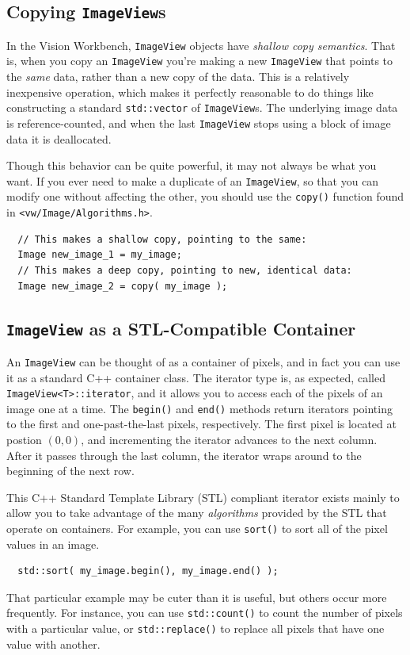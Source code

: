 \subsection{Copying {\tt ImageView}s}

In the Vision Workbench, \verb#ImageView# objects have {\it shallow 
copy semantics}.  That is, when you copy an \verb#ImageView# you're 
making a new \verb#ImageView# that points to the {\it same} data, 
rather than a new copy of the data.  This is a relatively inexpensive 
operation, which makes it perfectly reasonable to do things like 
constructing a standard \verb#std::vector# of \verb#ImageView#s.  The 
underlying image data is reference-counted, and when the last 
\verb#ImageView# stops using a block of image data it is deallocated. 

Though this behavior can be quite powerful, it may not always be 
what you want.  If you ever need to make a duplicate of an 
\verb#ImageView#, so that you can modify one without affecting the 
other, you should use the \verb#copy()# function found in 
\verb#<vw/Image/Algorithms.h>#.
\begin{verbatim}
  // This makes a shallow copy, pointing to the same:
  Image new_image_1 = my_image;
  // This makes a deep copy, pointing to new, identical data:
  Image new_image_2 = copy( my_image );
\end{verbatim}

\subsection{{\tt ImageView} as a STL-Compatible Container}

An \verb#ImageView# can be thought of as a container of pixels, and in
fact you can use it as a standard C++ container class.  The iterator
type is, as expected, called \verb#ImageView<T>::iterator#, and it
allows you to access each of the pixels of an image one at a time.
The \verb#begin()# and \verb#end()# methods return iterators pointing
to the first and one-past-the-last pixels, respectively.  The first
pixel is located at postion $(0,0)$, and incrementing the iterator
advances to the next column.  After it passes through the last column,
the iterator wraps around to the beginning of the next row.

This C++ Standard Template Library (STL) compliant iterator exists
mainly to allow you to take advantage of the many {\it algorithms}
provided by the STL that operate on containers.  For example, you can
use \verb#sort()# to sort all of the pixel values in an image.
\begin{verbatim}
  std::sort( my_image.begin(), my_image.end() );
\end{verbatim}
That particular example may be cuter than it is useful, but others
occur more frequently.  For instance, you can use \verb#std::count()# 
to count the number of pixels with a particular value, or
\verb#std::replace()# to replace all pixels that have one value with
another.

